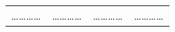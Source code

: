 \documentclass[a4paper, 11pt]{article}
\begin{document}
\begin{table}[hb]
\begin{tabular}{p{6cm} p{6cm} p{6cm} p{6cm}}
\dots\dots\dots\dots & \dots\dots\dots\dots & \dots\dots\dots\dots &\dots\dots\dots\dots \\
\end{tabular}
\end{table}
\end{document}
